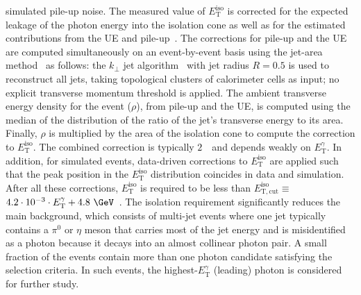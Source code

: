 \documentclass[cernpreprint,texlive=2016,txfonts,UKenglish]{latex/atlasdoc}
\def\etg{E_{\mathrm{T}}^{\gamma}}
\def\etiso{E_{\mathrm{T}}^{\mathrm{iso}}}
\def\etisoc{E_{\mathrm{T,cut}}^{\mathrm{iso}}}
\def\etisocut{$4.2\cdot 10^{-3}\cdot \etg +4.8\ {\mathrm{\GeV}}$}
\begin{document}
simulated pile-up noise. The measured value of $\etiso$ is corrected
for the expected leakage of the photon energy into the isolation cone
as well as for the estimated contributions from the UE and
pile-up~\cite{pr:d83:052005,pl:b706:150}. The corrections for pile-up
and the UE are computed simultaneously on an event-by-event basis
using the jet-area method~\cite{jhep:0804:005,jhep:1004:065} as
follows: the $k_\perp$ jet algorithm~\cite{pr:d48:3160,np:b406:187}
with jet radius $R=0.5$ is used to reconstruct all jets, taking
topological clusters of calorimeter cells as input; no explicit
transverse momentum threshold is applied. The ambient transverse
energy density for the event ($\rho$), from pile-up and the UE, is
computed using the median of the distribution of the ratio of the
jet's transverse energy to its area. Finally, $\rho$ is multiplied by
the area of the isolation cone to compute the correction to
$\etiso$. The combined correction is typically $2$~\GeV\ and depends
weakly on $\etg$. In addition, for simulated events, data-driven
corrections to $\etiso$ are applied such that the peak position in the
$\etiso$ distribution coincides in data and simulation. After all
these corrections, $\etiso$ is required to be less than
$\etisoc\equiv$~\etisocut~\cite{jhep:1608:005}. The isolation
requirement significantly reduces the main background, which consists
of multi-jet events where one jet typically contains a $\pi^0$ or
$\eta$ meson that carries most of the jet energy and is misidentified
as a photon because it decays into an almost collinear photon pair. A
small fraction of the events contain more than one photon candidate
satisfying the selection criteria. In such events, the highest-$\etg$
(leading) photon is considered for further study.
\end{document}
